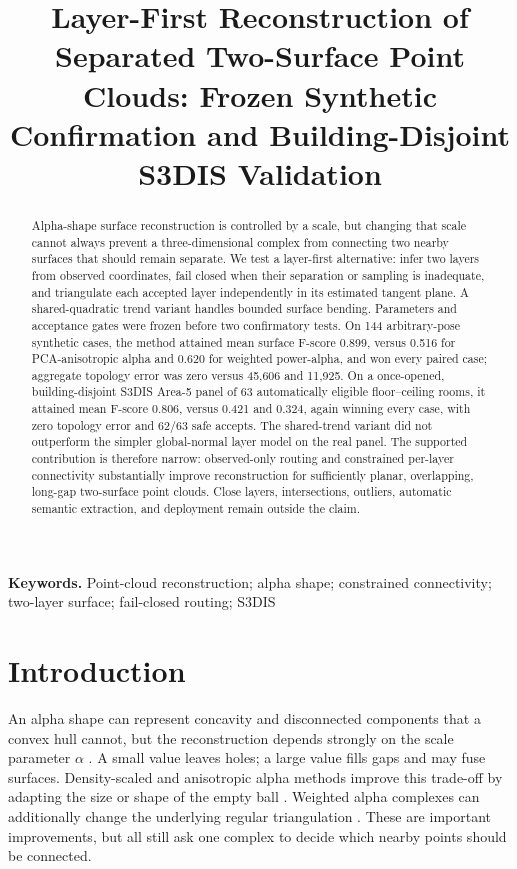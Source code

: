 \documentclass[12pt,a4paper]{article}
\title{Layer-First Reconstruction of Separated Two-Surface Point Clouds:
Frozen Synthetic Confirmation and Building-Disjoint S3DIS Validation}
\author{}
\date{}
\begin{document}
\maketitle
\thispagestyle{fancy}

\begin{abstract}
Alpha-shape surface reconstruction is controlled by a scale, but changing that
scale cannot always prevent a three-dimensional complex from connecting two
nearby surfaces that should remain separate. We test a layer-first alternative:
infer two layers from observed coordinates, fail closed when their separation or
sampling is inadequate, and triangulate each accepted layer independently in its
estimated tangent plane. A shared-quadratic trend variant handles bounded surface
bending. Parameters and acceptance gates were frozen before two confirmatory
tests. On 144 arbitrary-pose synthetic cases, the method attained mean surface
F-score 0.899, versus 0.516 for PCA-anisotropic alpha and 0.620 for weighted
power-alpha, and won every paired case; aggregate topology error was zero versus
45,606 and 11,925. On a once-opened, building-disjoint S3DIS Area-5 panel of 63
automatically eligible floor--ceiling rooms, it attained mean F-score 0.806,
versus 0.421 and 0.324, again winning every case, with zero topology error and
62/63 safe accepts. The shared-trend variant did not outperform the simpler
global-normal layer model on the real panel. The supported contribution is
therefore narrow: observed-only routing and constrained per-layer connectivity
substantially improve reconstruction for sufficiently planar, overlapping,
long-gap two-surface point clouds. Close layers, intersections, outliers,
automatic semantic extraction, and deployment remain outside the claim.
\end{abstract}

\noindent\textbf{Keywords.} Point-cloud reconstruction; alpha shape; constrained
connectivity; two-layer surface; fail-closed routing; S3DIS

\section{Introduction}

An alpha shape can represent concavity and disconnected components that a convex
hull cannot, but the reconstruction depends strongly on the scale parameter
$\alpha$ \citep{edelsbrunner1994}. A small value leaves holes; a large value fills
gaps and may fuse surfaces. Density-scaled and anisotropic alpha methods improve
this trade-off by adapting the size or shape of the empty ball
\citep{teichmann1998}. Weighted alpha complexes can additionally change the
underlying regular triangulation \citep{edelsbrunner1992}. These are important
improvements, but all still ask one complex to decide which nearby points should
be connected.
\end{document}
